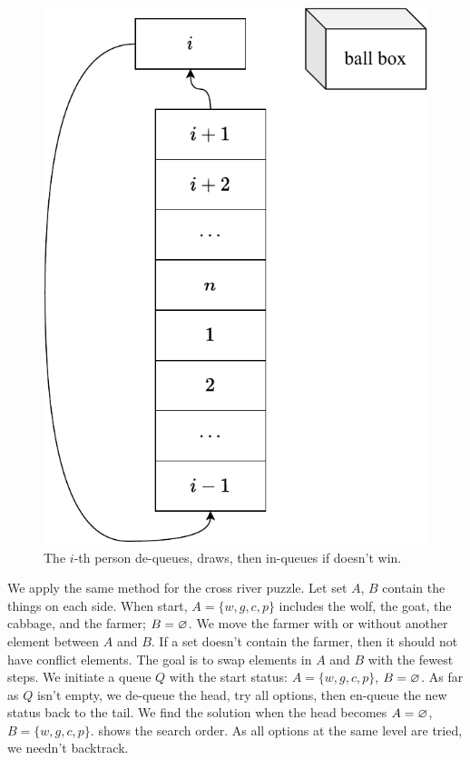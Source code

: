 \documentclass[b5paper]{article}
\begin{document}
\begin{figure}[htbp]
 \centering
 \includegraphics[scale=0.5]{img/luckydraw-queue}
 \caption{The $i$-th person de-queues, draws, then in-queues if doesn't win.}
 \label{fig:luck-draw}
\end{figure}

We apply the same method for the cross river puzzle. Let set $A$, $B$ contain the things on each side. When start, $A = \{w, g, c, p\}$ includes the wolf, the goat, the cabbage, and the farmer; $B=\varnothing$. We move the farmer with or without another element between $A$ and $B$. If a set doesn't contain the farmer, then it should not have conflict elements. The goal is to swap elements in $A$ and $B$ with the fewest steps. We initiate a queue $Q$ with the start status: $A = \{w, g, c, p\}$, $B=\varnothing$. As far as $Q$ isn't empty, we de-queue the head, try all options, then en-queue the new status back to the tail. We find the solution when the head becomes $A=\varnothing$, $B=\{w, g, c, p\}$.  shows the search order. As all options at the same level are tried, we needn't backtrack.
\end{document}

